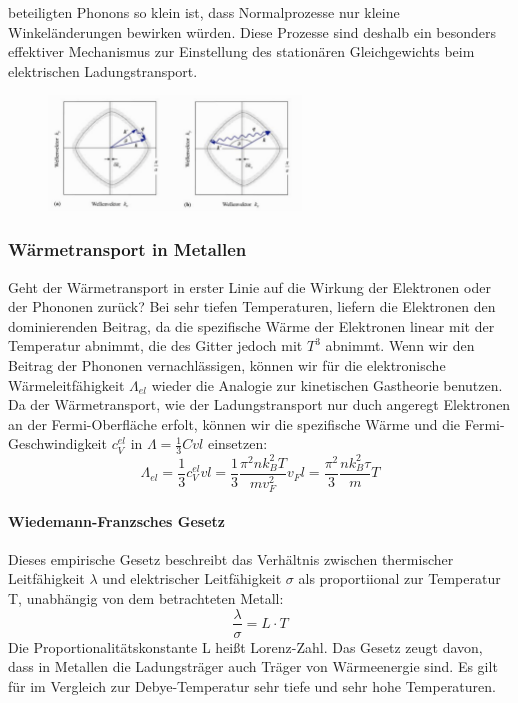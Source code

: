 \documentclass[11pt]{article}
\begin{document}
beteiligten Phonons so klein ist, dass Normalprozesse nur kleine
Winkeländerungen bewirken würden. Diese Prozesse sind deshalb ein besonders
effektiver Mechanismus zur Einstellung des stationären Gleichgewichts beim
elektrischen Ladungstransport.
\begin{figure}[h]
\includegraphics[width=0.6\textwidth]{streuung}
\centering
\label{fig:streuung}
\end{figure}
\subsubsection{Wärmetransport in Metallen}
Geht der Wärmetransport in erster Linie auf die Wirkung der Elektronen oder der
Phononen zurück? Bei sehr tiefen Temperaturen, liefern die Elektronen den
dominierenden Beitrag, da die spezifische Wärme der Elektronen linear mit der
Temperatur abnimmt, die des Gitter jedoch mit $T^3$ abnimmt. Wenn wir den
Beitrag der Phononen vernachlässigen, können wir für die elektronische
Wärmeleitfähigkeit $\Lambda_{el}$ wieder die Analogie zur kinetischen Gastheorie
benutzen. Da der Wärmetransport, wie der Ladungstransport nur duch angeregt
Elektronen an der Fermi-Oberfläche erfolt, können wir die spezifische Wärme und
die Fermi-Geschwindigkeit $c_V^{el}$ in $\Lambda=\frac{1}{3}Cvl$ einsetzen:
\begin{equation}
  \Lambda_{el}=\frac{1}{3}c_V^{el}vl=\frac{1}{3}\frac{\pi^2nk_B^2T}{mv_F^2}v_Fl
  =\frac{\pi^2}{3}\frac{nk_B^2\tau}{m}T
\end{equation}



\noindent \paragraph{Wiedemann-Franzsches Gesetz}
Dieses empirische Gesetz beschreibt das Verhältnis zwischen thermischer
Leitfähigkeit $\lambda$ und elektrischer Leitfähigkeit $\sigma$ als
proportiional zur Temperatur T, unabhängig von dem betrachteten Metall:
\begin{equation}
  \frac{\lambda}{\sigma}=L\cdot T
\end{equation}
Die Proportionalitätskonstante L heißt Lorenz-Zahl. Das Gesetz zeugt davon, dass
in Metallen die Ladungsträger auch Träger von Wärmeenergie sind. Es gilt für
im Vergleich zur Debye-Temperatur sehr tiefe und sehr hohe Temperaturen.
\end{document}
